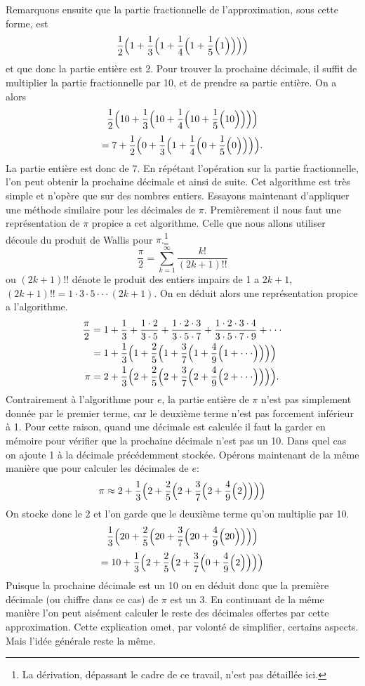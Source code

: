 \documentclass{article}
\begin{document}
Remarquons ensuite que la partie fractionnelle de l'approximation, sous cette forme, est
$$
\frac{1}{2}\Bigl(1+\frac{1}{3}\Bigl(1+\frac{1}{4}\Bigl(1+\frac{1}{5}\Bigl(1\Bigr)\Bigr)\Bigr)\Bigr)
$$
et que donc la partie entière est 2.
Pour trouver la prochaine décimale, il suffit de multiplier la partie fractionnelle par 10, et de prendre sa partie entière. On a alors
$$
\frac{1}{2}\Bigl(10+\frac{1}{3}\Bigl(10+\frac{1}{4}\Bigl(10+\frac{1}{5}\Bigl(10\Bigr)\Bigr)\Bigr)\Bigr)
$$
$$
=7+\frac{1}{2}\Bigl(0+\frac{1}{3}\Bigl(1+\frac{1}{4}\Bigl(0+\frac{1}{5}\Bigl(0\Bigr)\Bigr)\Bigr)\Bigr).
$$
La partie entière est donc de 7. En répétant l'opération sur la partie fractionnelle, l'on peut obtenir la prochaine décimale et ainsi de suite. Cet algorithme est très simple et n'opère que sur des nombres entiers. Essayons maintenant d'appliquer une méthode similaire pour les décimales de $\pi$.
Premièrement il nous faut une représentation de $\pi$ propice a cet algorithme. Celle que nous allons utiliser découle du produit de Wallis pour $\pi$.\footnote{La dérivation, dépassant le cadre de ce travail, n'est pas détaillée ici.} 
$$
\frac{\pi}{2} = \sum_{k=1}^{\infty}\frac{k!}{(2k+1)!!}
$$
ou $(2k+1)!!$ dénote le produit des entiers impairs de 1 a $2k+1$, $(2k+1)!! = 1\cdot3\cdot5\cdot\cdot\cdot (2k+1)$. 
On en déduit alors une représentation propice a l'algorithme.
\begin{align*}
\frac{\pi}{2} &= 1 + \frac{1}{3} + \frac{1\cdot2}{3\cdot5} +  \frac{1\cdot2\cdot3}{3\cdot5\cdot7} + \frac{1\cdot2\cdot3\cdot4}{3\cdot5\cdot7\cdot9} + \cdot\cdot\cdot\\
 &= 1 + \frac{1}{3}\Bigl(1+\frac{2}{5}\Bigl(1+\frac{3}{7}\Bigl(1+\frac{4}{9}\Bigl(1+\cdot\cdot\cdot\Bigr)\Bigr)\Bigr)\Bigr)\\
 \pi &= 2 + \frac{1}{3}\Bigl(2+\frac{2}{5}\Bigl(2+\frac{3}{7}\Bigl(2+\frac{4}{9}\Bigl(2+\cdot\cdot\cdot\Bigr)\Bigr)\Bigr)\Bigr).
\end{align*}
Contrairement à l'algorithme pour $e$, la partie entière de $\pi$ n'est pas simplement donnée par le premier terme, car le deuxième terme n'est pas forcement inférieur à 1. Pour cette raison, quand une décimale est calculée il faut la garder en mémoire pour vérifier que la prochaine décimale n'est pas un 10. Dans quel cas on ajoute 1 à la décimale précédemment stockée. Opérons maintenant de la même manière que pour calculer les décimales de $e$:
$$
\pi \approx 2 + \frac{1}{3}\Bigl(2+\frac{2}{5}\Bigl(2+\frac{3}{7}\Bigl(2+\frac{4}{9}\Bigl(2\Bigr)\Bigr)\Bigr)\Bigr)
$$
On stocke donc le 2 et l'on garde que le deuxième terme qu'on multiplie par 10.
$$
\frac{1}{3}\Bigl(20+\frac{2}{5}\Bigl(20+\frac{3}{7}\Bigl(20+\frac{4}{9}\Bigl(20\Bigr)\Bigr)\Bigr)\Bigr)
$$
$$
=10 + \frac{1}{3}\Bigl(2+\frac{2}{5}\Bigl(2+\frac{3}{7}\Bigl(0+\frac{4}{9}\Bigl(2\Bigr)\Bigr)\Bigr)\Bigr)
$$
Puisque la prochaine décimale est un 10 on en déduit donc que la première décimale (ou chiffre dans ce cas) de $\pi$ est un 3. En continuant de la même manière l'on peut aisément calculer le reste des décimales offertes par cette approximation. Cette explication omet, par volonté de simplifier, certains aspects. Mais l'idée générale reste la même. 
\end{document}
